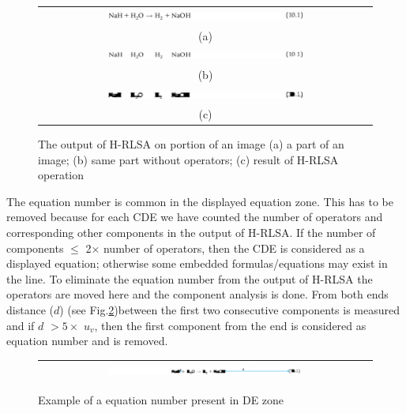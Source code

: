 \documentclass[oneside,a4paper,12pt]{book}
\begin{document}
\begin{figure}[h]\center\footnotesize
\begin{tabular}{|c|}
\hline
 \includegraphics[width=0.6\textwidth]{line.png} \\
 (a)\\ \hline
 \includegraphics[width=0.6\textwidth]{linewithoutOP.png} \\
 (b) \\ \hline
 \includegraphics[width=0.6\textwidth]{lineClosed.png}\\ 
 (c) \\\hline
 \end{tabular} 
 \caption{The output of H-RLSA on portion of an image (a) a part of an image;
 (b) same part without operators; (c) result of H-RLSA operation }
 \label{h-rlsa}
\end{figure}

The equation number is common in the displayed equation zone. This has to be removed because for each CDE
we have counted the number of operators  and corresponding other components  in the output of H-RLSA. If the number of components 
 $\le$ 2$\times$ number of operators, then the CDE is considered as a displayed equation;
otherwise some embedded formulas/equations may exist in the line. To eliminate the equation number from the output of H-RLSA  the operators are  moved here and the component 
analysis is done. From both ends distance ($d$) (see Fig.\ref{end_rev})between the first two consecutive components is measured and if $d$  $> 5\times$  $u_v$, 
then the first component from the end is considered as equation number and is removed.
\begin{figure}[h]\center\footnotesize
\begin{tabular}{|c|}
\hline
 \includegraphics[width=0.6\textwidth]{endRemoval.png} \\ \hline
 \end{tabular} 
 \caption{Example of a equation number present in DE zone}
 \label{end_rev}
\end{figure}
\end{document}
